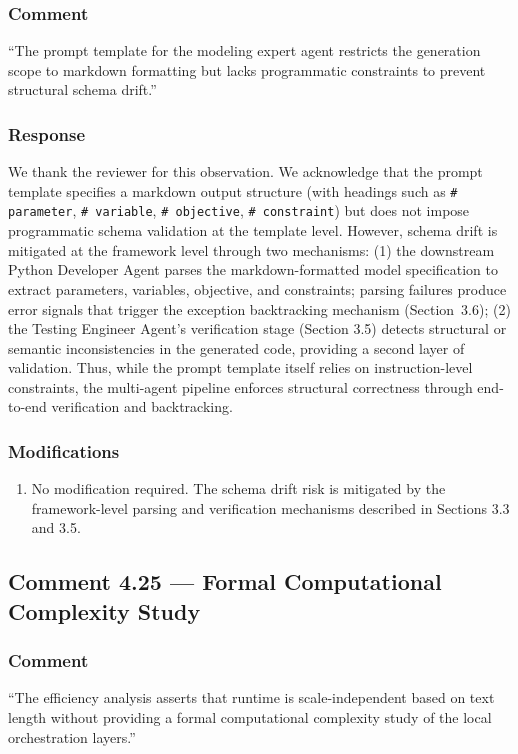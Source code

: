 \documentclass[11pt,a4paper]{article}
\begin{document}
\subsubsection{Comment}
``The prompt template for the modeling expert agent restricts the generation scope to markdown formatting but lacks programmatic constraints to prevent structural schema drift.''

\subsubsection{Response}
We thank the reviewer for this observation. We acknowledge that the prompt template specifies a markdown output structure (with headings such as \texttt{\# parameter}, \texttt{\# variable}, \texttt{\# objective}, \texttt{\# constraint}) but does not impose programmatic schema validation at the template level. However, schema drift is mitigated at the framework level through two mechanisms: (1) the downstream Python Developer Agent parses the markdown-formatted model specification to extract parameters, variables, objective, and constraints; parsing failures produce error signals that trigger the exception backtracking mechanism (Section~3.6); (2) the Testing Engineer Agent's verification stage (Section 3.5) detects structural or semantic inconsistencies in the generated code, providing a second layer of validation. Thus, while the prompt template itself relies on instruction-level constraints, the multi-agent pipeline enforces structural correctness through end-to-end verification and backtracking.

\subsubsection{Modifications}
\begin{enumerate}
\item No modification required. The schema drift risk is mitigated by the framework-level parsing and verification mechanisms described in Sections 3.3 and 3.5.
\end{enumerate}

\subsection{Comment 4.25 --- Formal Computational Complexity Study}

\subsubsection{Comment}
``The efficiency analysis asserts that runtime is scale-independent based on text length without providing a formal computational complexity study of the local orchestration layers.''
\end{document}
